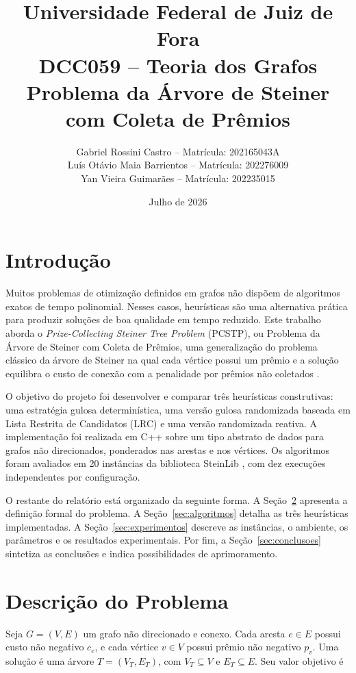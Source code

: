 \documentclass[12pt]{article}
\title{
    Universidade Federal de Juiz de Fora\\
    DCC059 -- Teoria dos Grafos\\
    \vspace{4.5cm}
    {\Huge\textbf{Problema da Árvore de Steiner\\com Coleta de Prêmios}}\\
    \vspace{4.5cm}
}
\author{
    Gabriel Rossini Castro -- Matrícula: 202165043A\\
    Luís Otávio Maia Barrientos -- Matrícula: 202276009\\
    Yan Vieira Guimarães -- Matrícula: 202235015
}
\date{Julho de 2026}
\begin{document}
\maketitle
\thispagestyle{empty}
\newpage

\tableofcontents
\thispagestyle{empty}
\newpage
\setcounter{page}{1}

\section{Introdução}

Muitos problemas de otimização definidos em grafos não dispõem de algoritmos exatos de tempo polinomial. Nesses casos, heurísticas são uma alternativa prática para produzir soluções de boa qualidade em tempo reduzido. Este trabalho aborda o \textit{Prize-Collecting Steiner Tree Problem} (PCSTP), ou Problema da Árvore de Steiner com Coleta de Prêmios, uma generalização do problema clássico da árvore de Steiner na qual cada vértice possui um prêmio e a solução equilibra o custo de conexão com a penalidade por prêmios não coletados \cite{goemans1995general}.

O objetivo do projeto foi desenvolver e comparar três heurísticas construtivas: uma estratégia gulosa determinística, uma versão gulosa randomizada baseada em Lista Restrita de Candidatos (LRC) e uma versão randomizada reativa. A implementação foi realizada em C++ sobre um tipo abstrato de dados para grafos não direcionados, ponderados nas arestas e nos vértices. Os algoritmos foram avaliados em 20 instâncias da biblioteca SteinLib \cite{koch2001steinlib}, com dez execuções independentes por configuração.

O restante do relatório está organizado da seguinte forma. A Seção~\ref{sec:problema} apresenta a definição formal do problema. A Seção~\ref{sec:algoritmos} detalha as três heurísticas implementadas. A Seção~\ref{sec:experimentos} descreve as instâncias, o ambiente, os parâmetros e os resultados experimentais. Por fim, a Seção~\ref{sec:conclusoes} sintetiza as conclusões e indica possibilidades de aprimoramento.

\section{Descrição do Problema}
\label{sec:problema}

Seja $G=(V,E)$ um grafo não direcionado e conexo. Cada aresta $e\in E$ possui custo não negativo $c_e$, e cada vértice $v\in V$ possui prêmio não negativo $p_v$. Uma solução é uma árvore $T=(V_T,E_T)$, com $V_T\subseteq V$ e $E_T\subseteq E$. Seu valor objetivo é
\end{document}
